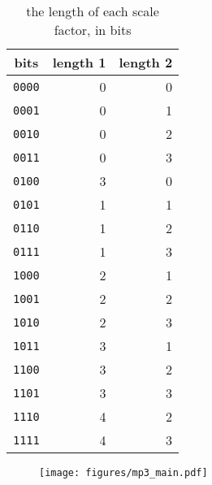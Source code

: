 \documentclass[letter]{scrbook}
\begin{document}
\begin{table}[h]
\begin{tabular}{|c|r|r|}
\hline
bits & length 1 & length 2 \\
\hline
\texttt{0000} & 0 & 0 \\
\texttt{0001} & 0 & 1 \\
\texttt{0010} & 0 & 2 \\
\texttt{0011} & 0 & 3 \\
\texttt{0100} & 3 & 0 \\
\texttt{0101} & 1 & 1 \\
\texttt{0110} & 1 & 2 \\
\texttt{0111} & 1 & 3 \\
\texttt{1000} & 2 & 1 \\
\texttt{1001} & 2 & 2 \\
\texttt{1010} & 2 & 3 \\
\texttt{1011} & 3 & 1 \\
\texttt{1100} & 3 & 2 \\
\texttt{1101} & 3 & 3 \\
\texttt{1110} & 4 & 2 \\
\texttt{1111} & 4 & 3 \\
\hline
\end{tabular}
\caption{the length of each scale factor, in bits}
\end{table}

\begin{figure}[h]
\texttt{[image: figures/mp3\_main.pdf]}
\end{figure}
\end{document}
